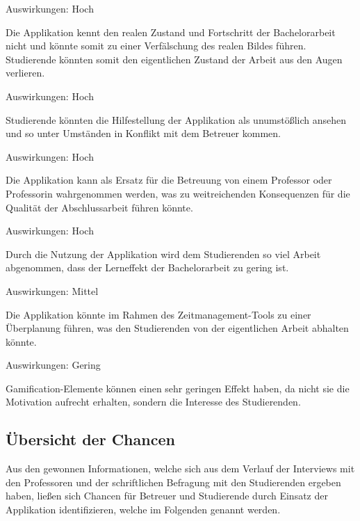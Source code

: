 \documentclass[bibliography=totoc,listof=totoc,BCOR=5mm,DIV=12,oneside]{scrbook}
\begin{document}
\begin{enumerate} [label=\textit{[R\arabic*]}]
\item \label{risk:realerZustand} 
\par Auswirkungen: Hoch
\par Die Applikation kennt den realen Zustand und Fortschritt der Bachelorarbeit nicht und könnte somit zu einer Verfälschung des realen Bildes führen. Studierende könnten somit den eigentlichen Zustand der Arbeit aus den Augen verlieren.
\item \label{risk:inhaltUnumstoesslich} 
\par Auswirkungen: Hoch
\par Studierende könnten die Hilfestellung der Applikation als unumstößlich ansehen und so unter Umständen in Konflikt mit dem Betreuer kommen.
\item \label{risk:erstazBetreuer} 
\par Auswirkungen: Hoch
\par Die Applikation kann als Ersatz für die Betreuung von einem Professor oder Professorin wahrgenommen werden, was zu weitreichenden Konsequenzen für die Qualität der Abschlussarbeit führen könnte.
\item \label{risk:keinLerneffekt} 
\par Auswirkungen: Hoch
\par Durch die Nutzung der Applikation wird dem Studierenden so viel Arbeit abgenommen, dass der Lerneffekt der Bachelorarbeit zu gering ist.
\item \label{risk:ueberplanung} 
\par Auswirkungen: Mittel
\par Die Applikation könnte im Rahmen des Zeitmanagement-Tools zu einer Überplanung führen, was den Studierenden von der eigentlichen Arbeit abhalten könnte.
\item \label{risk:gamificationEffekt} 
\par Auswirkungen: Gering
\par Gamification-Elemente können einen sehr geringen Effekt haben, da nicht sie die Motivation aufrecht erhalten, sondern die Interesse des Studierenden.
\end{enumerate}

\newpage
\subsection{Übersicht der Chancen} \label{sub:chancenuebersicht}
\par Aus den gewonnen Informationen, welche sich aus dem Verlauf der Interviews mit den Professoren und der schriftlichen Befragung mit den Studierenden ergeben haben, ließen sich Chancen für Betreuer und Studierende durch Einsatz der Applikation identifizieren, welche im Folgenden genannt werden.
\end{document}

